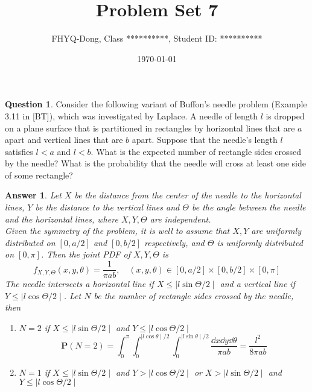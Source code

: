 \documentclass[utf8]{article}
\title{Problem Set 7}
\author{ FHYQ-Dong, Class **********, Student ID: ********** }
\date{\today}
\theoremstyle{definition}%
\newtheorem{question}{Question} %
\theoremstyle{plain}%
\newtheorem{answer}{Answer} %
\begin{document}
\maketitle
\thispagestyle{fancy}

\begin{question}
    Consider the following variant of Buffon's needle problem (Example 3.11 in [BT]), which was investigated by Laplace. A needle of length $l$ is dropped on a plane surface that is partitioned in rectangles by horizontal lines that are $a$ apart and vertical lines that are $b$ apart. Suppose that the needle's length $l$ satisfies $l < a$ and $l < b$. What is the expected number of rectangle sides crossed by the needle? What is the probability that the needle will cross at least one side of some rectangle?
\end{question}
\begin{answer}
    Let $X$ be the distance from the center of the needle to the horizontal lines, $Y$ be the distance to the vertical lines and $\Theta$ be the angle between the needle and the horizontal lines, where $X, Y, \Theta$ are independent. \\ 
    Given the symmetry of the problem, it is well to assume that $X, Y$ are uniformly distributed on $[0, a/2]$ and $[0, b/2]$ respectively, and $\Theta$ is uniformly distributed on $[0, \pi]$. Then the joint PDF of $X, Y, \Theta$ is
    \begin{equation}
        f_{X, Y, \Theta}(x, y, \theta) = \frac{1}{\pi a b}, \quad (x, y, \theta) \in [0, a/2] \times [0, b/2] \times [0, \pi]
    \end{equation}
    The needle intersects a horizontal line if $X \leq \mid l \sin \Theta / 2 \mid$ and a vertical line if $Y \leq \mid l \cos \Theta / 2 \mid$. Let $N$ be the number of rectangle sides crossed by the needle, then
    \begin{enumerate}[label=(\alph*)]
        \item $N = 2$ if $X \leq \mid l \sin \Theta / 2 \mid$ and $Y \leq \mid l \cos \Theta / 2 \mid$
        \begin{equation}
            \mathbf{P}(N = 2) = \int_{0}^{\pi}\int_{0}^{\mid l\cos\theta \mid/2}\int_{0}^{\mid l\sin\theta \mid/2} \frac{\dd{x}\dd{y}\dd{\theta}}{\pi a b} = \frac{l^2}{8\pi ab}
        \end{equation}
        \item $N = 1$ if $X \leq \mid l \sin \Theta / 2 \mid$ and $Y > \mid l \cos \Theta / 2 \mid$ or $X > \mid l \sin \Theta / 2 \mid$ and $Y \leq \mid l \cos \Theta / 2 \mid$

\end{enumerate}
\end{answer}
\end{document}
